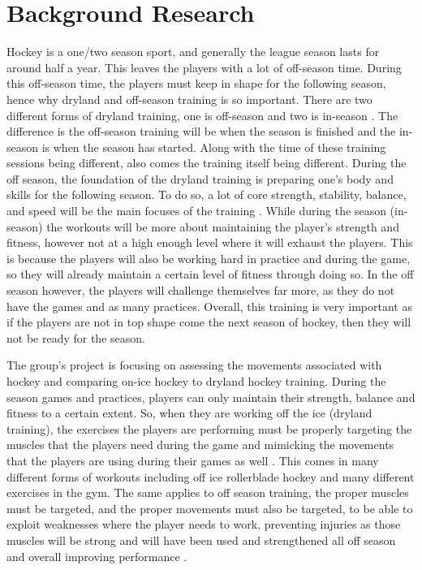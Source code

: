 \section{Background Research}
Hockey is a one/two season sport, and generally the league season lasts for around half a year. This leaves the players with a lot of off-season time. During this off-season time, the players must keep in shape for the following season, hence why dryland and off-season training is so important. There are two different forms of dryland training, one is off-season and two is in-season \cite{1}. The difference is the off-season training will be when the season is finished and the in-season is when the season has started. Along with the time of these training sessions being different, also comes the training itself being different. During the off season, the foundation of the dryland training is preparing one's body and skills for the following season. To do so, a lot of core strength, stability, balance, and speed will be the main focuses of the training \cite{2}. While during the season (in-season) the workouts will be more about maintaining the player’s strength and fitness, however not at a high enough level where it will exhaust the players. This is because the players will also be working hard in practice and during the game, so they will already maintain a certain level of fitness through doing so. In the off season however, the players will challenge themselves far more, as they do not have the games and as many practices. Overall, this training is very important as if the players are not in top shape come the next season of hockey, then they will not be ready for the season.\par
The group’s project is focusing on assessing the movements associated with hockey and comparing on-ice hockey to dryland hockey training. During the season games and practices, players can only maintain their strength, balance and fitness to a certain extent. So, when they are working off the ice (dryland training), the exercises the players are performing must be properly targeting the muscles that the players need during the game and mimicking the movements that the players are using during their games as well \cite{1}. This comes in many different forms of workouts including off ice rollerblade hockey and many different exercises in the gym. The same applies to off season training, the proper muscles must be targeted, and the proper movements must also be targeted, to be able to exploit weaknesses where the player needs to work, preventing injuries as those muscles will be strong and will have been used and strengthened all off season and overall improving performance \cite{2}.\par
